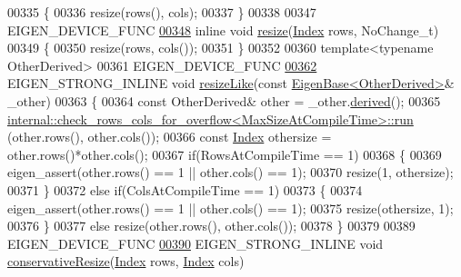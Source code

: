 \begin{DoxyCode}
00335     \{
00336       resize(rows(), cols);
00337     \}
00338 
00347     EIGEN\_DEVICE\_FUNC
\hyperlink{class_eigen_1_1_plain_object_base_a7b44761b7350ae3756035bbf7d7c04f6}{00348}     \textcolor{keyword}{inline} \textcolor{keywordtype}{void} \hyperlink{class_eigen_1_1_plain_object_base_a7b44761b7350ae3756035bbf7d7c04f6}{resize}(\hyperlink{namespace_eigen_a62e77e0933482dafde8fe197d9a2cfde}{Index} rows, NoChange\_t)
00349     \{
00350       resize(rows, cols());
00351     \}
00352 
00360     \textcolor{keyword}{template}<\textcolor{keyword}{typename} OtherDerived>
00361     EIGEN\_DEVICE\_FUNC 
\hyperlink{class_eigen_1_1_plain_object_base_acc7200947e6399bee847ff37c8270fc8}{00362}     EIGEN\_STRONG\_INLINE \textcolor{keywordtype}{void} \hyperlink{class_eigen_1_1_plain_object_base_acc7200947e6399bee847ff37c8270fc8}{resizeLike}(\textcolor{keyword}{const} \hyperlink{group___core___module_struct_eigen_1_1_eigen_base}{EigenBase<OtherDerived>}& 
      \_other)
00363     \{
00364       \textcolor{keyword}{const} OtherDerived& other = \_other.\hyperlink{group___core___module_a324b16961a11d2ecfd2d1b7dd7946545}{derived}();
00365       \hyperlink{struct_eigen_1_1internal_1_1check__rows__cols__for__overflow}{internal::check\_rows\_cols\_for\_overflow<MaxSizeAtCompileTime>::run}
      (other.rows(), other.cols());
00366       \textcolor{keyword}{const} \hyperlink{namespace_eigen_a62e77e0933482dafde8fe197d9a2cfde}{Index} othersize = other.rows()*other.cols();
00367       \textcolor{keywordflow}{if}(RowsAtCompileTime == 1)
00368       \{
00369         eigen\_assert(other.rows() == 1 || other.cols() == 1);
00370         resize(1, othersize);
00371       \}
00372       \textcolor{keywordflow}{else} \textcolor{keywordflow}{if}(ColsAtCompileTime == 1)
00373       \{
00374         eigen\_assert(other.rows() == 1 || other.cols() == 1);
00375         resize(othersize, 1);
00376       \}
00377       \textcolor{keywordflow}{else} resize(other.rows(), other.cols());
00378     \}
00379 
00389     EIGEN\_DEVICE\_FUNC
\hyperlink{class_eigen_1_1_plain_object_base_a5e06c62950ba98fe8ba9c7d4be9c19e4}{00390}     EIGEN\_STRONG\_INLINE \textcolor{keywordtype}{void} \hyperlink{class_eigen_1_1_plain_object_base_a5e06c62950ba98fe8ba9c7d4be9c19e4}{conservativeResize}(\hyperlink{namespace_eigen_a62e77e0933482dafde8fe197d9a2cfde}{Index} rows, 
      \hyperlink{namespace_eigen_a62e77e0933482dafde8fe197d9a2cfde}{Index} cols)

\end{DoxyCode}
